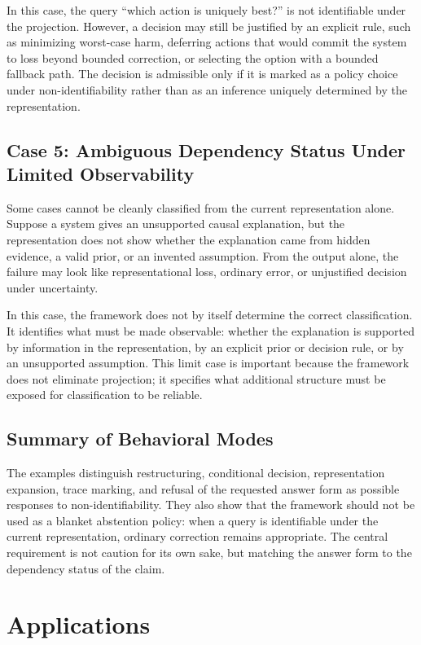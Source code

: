 \documentclass[11pt]{article}
\begin{document}
In this case, the query ``which action is uniquely best?'' is not identifiable under the projection. However, a decision may still be justified by an explicit rule, such as minimizing worst-case harm, deferring actions that would commit the system to loss beyond bounded correction, or selecting the option with a bounded fallback path. The decision is admissible only if it is marked as a policy choice under non-identifiability rather than as an inference uniquely determined by the representation.

\subsection{Case 5: Ambiguous Dependency Status Under Limited Observability}

Some cases cannot be cleanly classified from the current representation alone. Suppose a system gives an unsupported causal explanation, but the representation does not show whether the explanation came from hidden evidence, a valid prior, or an invented assumption. From the output alone, the failure may look like representational loss, ordinary error, or unjustified decision under uncertainty.

In this case, the framework does not by itself determine the correct classification. It identifies what must be made observable: whether the explanation is supported by information in the representation, by an explicit prior or decision rule, or by an unsupported assumption. This limit case is important because the framework does not eliminate projection; it specifies what additional structure must be exposed for classification to be reliable.

\subsection{Summary of Behavioral Modes}

The examples distinguish restructuring, conditional decision, representation expansion, trace marking, and refusal of the requested answer form as possible responses to non-identifiability. They also show that the framework should not be used as a blanket abstention policy: when a query is identifiable under the current representation, ordinary correction remains appropriate. The central requirement is not caution for its own sake, but matching the answer form to the dependency status of the claim.

\section{Applications}
\end{document}
